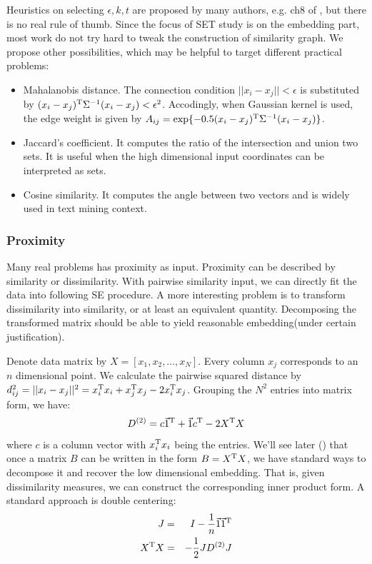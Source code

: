 Heuristics on selecting $\epsilon, k, t$ are proposed by many authors, 
e.g. ch8 of \cite{von2007tutorial}, but there is no real 
rule of thumb. Since the focus of SET study is on the embedding part, 
most work do not try hard to tweak the construction of similarity graph. 
We propose other possibilities, which may be helpful to target 
different practical problems:
\begin{itemize}
	\item Mahalanobis distance\cite{wiki_md}. The connection condition 
		$||x_i-x_j|| < \epsilon$ is substituted by 
		$(x_i-x_j)^\mathrm{T}\Sigma^{-1}(x_i-x_j) < \epsilon^2$. 
		Accodingly, when Gaussian kernel is used, the edge weight
		is given by $A_{ij} = \exp\{-0.5(x_i-x_j)^\mathrm{T}\Sigma^{-1}(x_i-x_j)\}$. 
	\item Jaccard's coefficient\cite{wiki_jaccard}. It computes the ratio 
		of the intersection and union two sets. It is useful when 
		the high dimensional input coordinates can be interpreted as 
		sets. 
	\item Cosine similarity\cite{wiki_cos}. It computes the 
		angle between two vectors and is widely used in 
		text mining context. 
\end{itemize}


\subsubsection{Proximity}
\label{sec:proximity}

Many real problems has proximity as input. Proximity 
can be described by similarity or dissimilarity. 
With pairwise similarity input, we can directly fit the 
data into following SE procedure. A more interesting 
problem is to transform dissimilarity into similarity, 
or at least an equivalent quantity. 
Decomposing the transformed matrix should be able to yield
reasonable embedding(under certain justification). 

Denote data matrix by $X = [x_1, x_2, \ldots, x_N]$. Every 
column $x_j$ corresponds to an $n$ dimensional point. We 
calculate the pairwise squared distance by 
$d^2_{ij} = ||x_i - x_j||^2 = x_i^\mathrm{T}x_i + x_j^\mathrm{T}x_j - 2x_i^\mathrm{T}x_j$. 
Grouping the $N^2$ entries into matrix form, we have:
\begin{equation}
	D^{(2)} = c\vec{1}^\mathrm{T} + \vec{1}c^\mathrm{T} - 2 X^\mathrm{T}X
\end{equation}
where $c$ is a column vector with $x_i^\mathrm{T}x_i$ being the entries. 
We'll see later (\rsec{\ref{sec:mds}}) that once a matrix $B$ can be 
written in the form $B = X^\mathrm{T}X$, we have standard ways to decompose
it and recover the low dimensional embedding. That is, given 
dissimilarity measures, we can construct the corresponding inner 
product form. A standard approach is double centering: \cite{borg2005modern}
\begin{eqnarray}
	J &=& I - \frac{1}{n} \vec{1} \vec{1}^\mathrm{T} \\
	X^\mathrm{T}X &=& -\frac{1}{2}JD^{(2)}J
\end{eqnarray}

